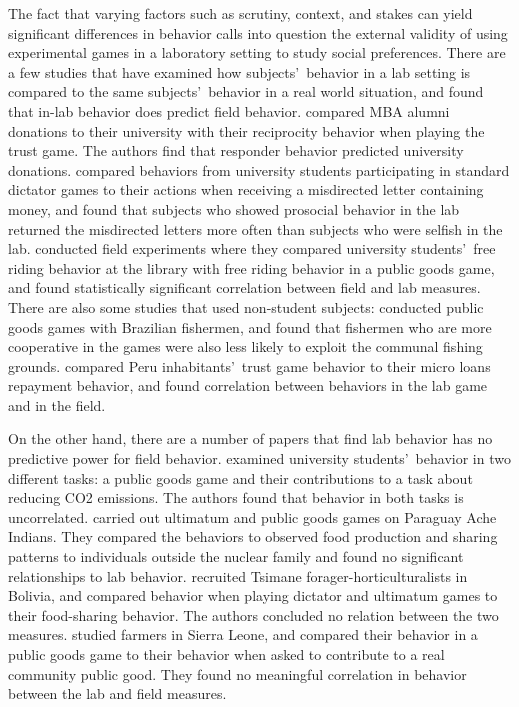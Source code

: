\documentclass[12pt]{article}
\begin{document}
The fact that varying factors such as scrutiny, context, and stakes can yield significant differences in behavior calls into question the external validity of using experimental games in a laboratory setting to study social preferences. There are a few studies that have examined how subjects\rq \ behavior in a lab setting is compared to the same subjects\rq  \ behavior in a real world situation, and found that in-lab behavior does predict field behavior. \cite{baran_2010} compared MBA alumni donations to their university with their reciprocity behavior when playing the trust game. The authors find that responder behavior predicted university donations. \cite{franzen_pointner_2012} compared behaviors from university students participating in standard dictator games to their actions when receiving a misdirected letter containing money, and found that subjects who showed prosocial behavior in the lab returned the misdirected letters more often than subjects who were selfish in the lab. \cite{englmaier_gebhardt_2011} conducted field experiments where they compared university students\rq \ free riding behavior at the library with free riding behavior in a public goods game, and found statistically significant correlation between field and lab measures. There are also some studies that used non-student subjects: \cite{fehr_leibbrandt_2011} conducted public goods games with Brazilian fishermen, and found that fishermen who are more cooperative in the games were also less likely to exploit the communal fishing grounds. \cite{karlan_2005} compared Peru inhabitants\rq \ trust game behavior to their micro loans repayment behavior, and found correlation between behaviors in the lab game and in the field. 

On the other hand, there are a number of papers that find lab behavior has no predictive power for field behavior. \cite{goeschl_2015} examined university students\rq \ behavior in two different tasks: a public goods game and their contributions to a task about reducing CO2 emissions. The authors found that behavior in both tasks is uncorrelated. \cite{hill_gurven_2004} carried out ultimatum and public goods games on Paraguay Ache Indians. They compared the behaviors to observed food production and sharing patterns to individuals outside the nuclear family and found no significant relationships to lab behavior. \cite{gurven_winking_2008} recruited Tsimane forager-horticulturalists in Bolivia, and compared behavior when playing dictator and ultimatum games to their food-sharing behavior. The authors concluded no relation between the two measures. \cite{voors_2012} studied farmers in Sierra Leone, and compared their behavior in a public goods game to their behavior when asked to contribute to a real community public good. They found no meaningful correlation in behavior between the lab and field measures. 
\end{document}
